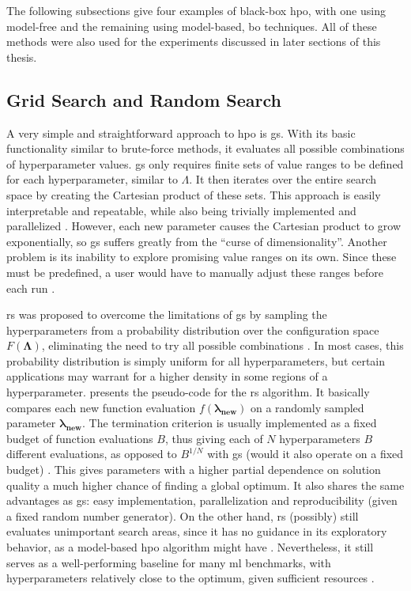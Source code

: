 The following subsections give four examples of black-box \gls{hpo}, with one using model-free and the remaining using model-based, \gls{bo} techniques. All of these methods were also used for the experiments discussed in later sections of this thesis.

\subsection{Grid Search and Random Search}

A very simple and straightforward approach to \gls{hpo} is \gls{gs}. With its basic functionality similar to brute-force methods, it evaluates all possible combinations of hyperparameter values. \gls{gs} only requires finite sets of value ranges to be defined for each hyperparameter, similar to $\Lambda$. It then iterates over the entire search space by creating the Cartesian product of these sets. This approach is easily interpretable and repeatable, while also being trivially implemented and parallelized \cite{bergstra2012random}. However, each new parameter causes the Cartesian product to grow exponentially, so \gls{gs} suffers greatly from the \enquote{curse of dimensionality}. Another problem is its inability to explore promising value ranges on its own. Since these must be predefined, a user would have to manually adjust these ranges before each run \cite{yang2020hyperparameter}.

\gls{rs} was proposed to overcome the limitations of \gls{gs} by sampling the hyperparameters from a probability distribution over the configuration space $F(\mathbf{\Lambda})$, eliminating the need to try all possible combinations \cite{bergstra2012random}. In most cases, this probability distribution is simply uniform for all hyperparameters, but certain applications may warrant for a higher density in some regions of a hyperparameter.  presents the pseudo-code for the \gls{rs} algorithm. It basically compares each new function evaluation $f(\mathbf{\lambda_{\text{new}}})$ on a randomly sampled parameter $\mathbf{\lambda_{\text{new}}}$. The termination criterion is usually implemented as a fixed budget of function evaluations $B$, thus giving each of $N$ hyperparameters $B$ different evaluations, as opposed to $B^{1/N}$ with \gls{gs} (would it also operate on a fixed budget) \cite{bergstra2012random}. This gives parameters with a higher partial dependence on solution quality a much higher chance of finding a global optimum. It also shares the same advantages as \gls{gs}: easy implementation, parallelization and reproducibility (given a fixed random number generator). On the other hand, \gls{rs} (possibly) still evaluates unimportant search areas, since it has no guidance in its exploratory behavior, as a model-based \gls{hpo} algorithm might have \cite{yang2020hyperparameter}.
Nevertheless, it still serves as a well-performing baseline for many \gls{ml} benchmarks, with hyperparameters relatively close to the optimum, given sufficient resources \cite{feurer2019hyperparameter}.

